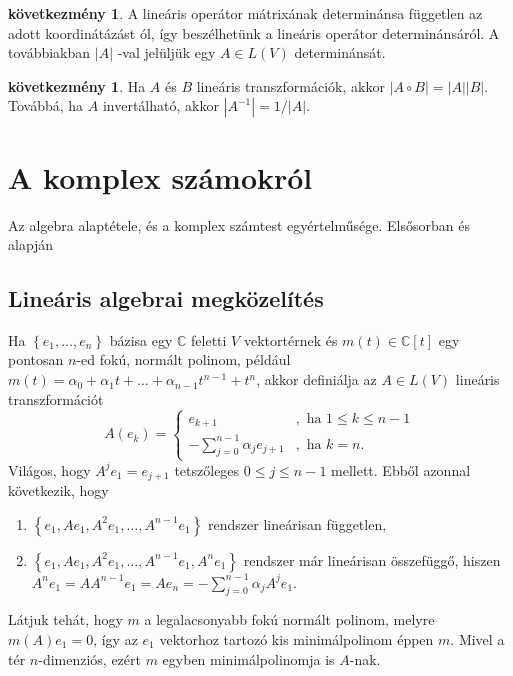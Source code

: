 \documentclass[9pt, a4paper, showtrims]{memoir}
\theoremstyle{plain}
\theoremstyle{remark}
\theoremstyle{definition}
\newtheorem{corollary}[proposition]{következmény}
\begin{document}
\begin{corollary}
A lineáris operátor mátrixának determinánsa független az adott koordinátázást%
ól, így beszélhetünk a lineáris operátor determinánsáról. A továbbiakban $%
\left| A\right| $ -val jelüljük egy $A\in L\left( V\right) $ determinánsát.
\end{corollary}

\begin{corollary}
Ha $A$ és $B$ lineáris transzformációk, akkor $\left| A\circ B\right|
=\left| A\right| \left| B\right| .$ Továbbá, ha $A$ invertálható, akkor $%
\left| A^{-1}\right| =1/\left| A\right| .$
\end{corollary}



    \appendix
    \renewcommand{\appendixpagename}{Függelékek}\renewcommand{\appendixtocname}{\appendixpagename}
    \appendixpage





\chapter{A komplex számokról}
Az algebra alaptétele, és a komplex számtest egyértelműsége. Elsősorban \parencite{MR1415833} és \parencite{10.2307/3647746} alapján
\section{Lineáris algebrai megközelítés}
Ha $\left\{ e_1,\dots,e_n \right\}$ bázisa egy $\mathbb{C}$ feletti $V$ vektortérnek
és $m\left( t \right)\in\mathbb{C}\left[ t \right]$ egy pontosan $n$-ed fokú, 
normált polinom,
például
$m\left( t \right)=\alpha_0+\alpha_1 t+\dots+\alpha_{n-1}t^{n-1}+t^{n}$,
akkor definiálja az $A\in L\left( V \right)$ lineáris transzformációt
\[
    A\left( e_k \right)=
    \begin{cases}
        e_{k+1}&, \text{ ha } 1\leq k \leq n-1\\
        -\sum_{j=0}^{n-1}\alpha_j e_{j+1}&, \text{ ha } k=n.
    \end{cases}
\]
Világos, hogy $A^je_1=e_{j+1}$ tetszőleges $0\leq j\leq n-1$ mellett.
Ebből azonnal következik, hogy 
\begin{enumerate}
    \item 
        $\left\{ e_1, Ae_1,A^2e_1,\dots,A^{n-1}e_1\right\}$ rendszer lineárisan független,
    \item
        $\left\{ e_1, Ae_1,A^2e_1,\dots,A^{n-1}e_1,A^ne_1\right\}$ rendszer már lineárisan összefüggő,
        hiszen
        $A^ne_1=AA^{n-1}e_1=Ae_n=-\sum_{j=0}^{n-1}\alpha_j A^je_1$.
\end{enumerate}
Látjuk tehát, hogy $m$ a legalacsonyabb fokú normált polinom, melyre
$m\left( A \right)e_1=0$,
így az $e_1$ vektorhoz tartozó kis minimálpolinom éppen $m$.
Mivel a tér $n$-dimenziós, ezért $m$ egyben minimálpolinomja is $A$-nak.
\end{document}
